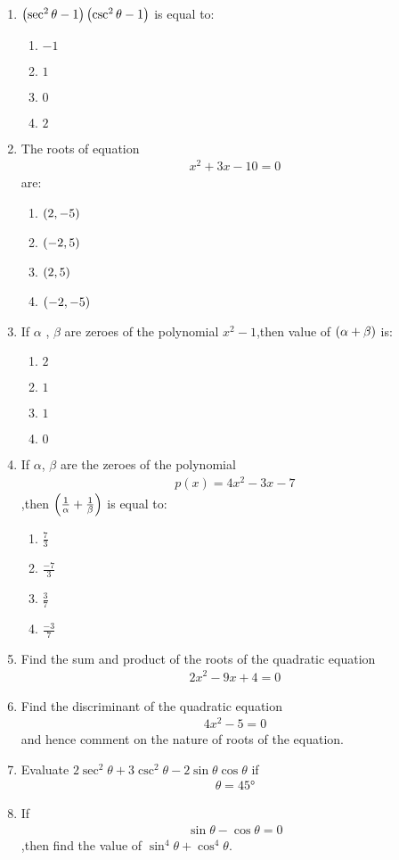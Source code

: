 
\begin{enumerate}
    \item $\left(\sec^2\theta - 1\right)\left(\csc^2\theta - 1\right)$  is equal to:
    \begin{enumerate}
        \item $-1$
        \item  $1$
        \item  $0$
        \item  $2$
        \end{enumerate}
    \item The roots of equation 
    \begin{align}
        x^2 + 3x - 10 = 0
    \end{align}
    are:
    \begin{enumerate}
        \item $\left(2,-5\right)$
        \item $\left(-2,5\right)$
        \item $\left(2,5\right)$
        \item $\left(-2,-5\right)$
    \end{enumerate}
    \item If $\alpha$ , $\beta$ are zeroes of the polynomial $x^2-1$,then value of $\left(\alpha+\beta\right)$ is:
    \begin{enumerate}
        \item $2$
        \item $1$
        \item $1$
        \item $0$
    \end{enumerate}
    \pagebreak
   \item  If $\alpha$, $\beta$ are the zeroes of the polynomial
   \begin{align}
       p(x)=4x^2 - 3x -7
   \end{align}
   ,then $\left(\frac{1}{\alpha}+\frac{1}{\beta}\right)$ is equal to:
   \begin{enumerate}
       \item $\frac{7}{3}$
       \item $\frac{-7}{3}$
       \item $\frac{3}{7}$
       \item $\frac{-3}{7}$
   \end{enumerate}
   \item  Find the sum and product of the roots of the quadratic equation 
   \begin{align}
       2x^2-9x+4=0
   \end{align}
   \item Find the discriminant of the quadratic equation 
   \begin{align}
       4x^2-5=0
   \end{align}
   and hence comment on the nature of roots of the equation.
   \item Evaluate $2\sec^2\theta+3\csc^2\theta-2\sin\theta\cos\theta$ if
   \begin{align}
        \theta=45\si{\degree}
   \end{align}
  
   \item If
   \begin{align}
       \sin\theta-\cos\theta=0
   \end{align}
   ,then find the value of $\sin^4\theta+\cos^4\theta$.
\end{enumerate}

